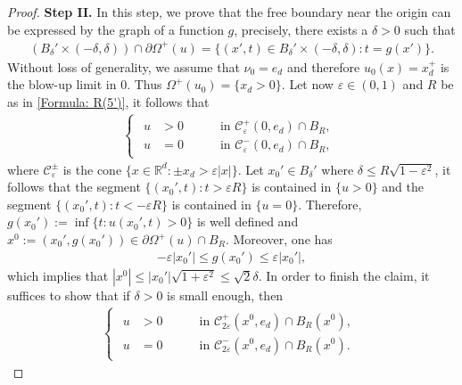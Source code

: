 \documentclass[11pt,reqno]{amsart}
\begin{document}
\begin{proof}
	\textbf{Step II.} In this step, we prove that the free boundary near the origin can be expressed by the graph of a function $g$, precisely, there exists a $\delta>0$ such that
	\begin{align*}
		(B_{\delta}'\times(-\delta,\delta))\cap\partial\varOmega^{+}(u)=\{(x',t)\in B_{\delta}'\times(-\delta,\delta)\colon t=g(x')\}.
	\end{align*}
	Without loss of generality, we assume that $\nu_{0}=e_{d}$ and therefore $u_{0}(x)=x_{d}^{+}$ is the blow-up limit in $0$. Thus $\varOmega^{+}(u_{0})=\{x_{d}>0\}$. Let now $\varepsilon\in(0,1)$ and $R$ be as in \eqref{Formula: R(5')}, it follows that
	\begin{align*}
		\begin{cases}
			\begin{alignedat}{2}
				u&>0\quad&&\text{ in }\mathcal{C}_{\varepsilon}^{+}(0,e_{d})\cap B_{R},\\
				u&=0\quad&&\text{ in }\mathcal{C}_{\varepsilon}^{-}(0,e_{d})\cap B_{R},
			\end{alignedat}
		\end{cases}
	\end{align*}
	where $\mathcal{C}_{\varepsilon}^{\pm}$ is the cone $\{x\in\mathbb{R}^{d}\colon\pm x_{d}>\varepsilon|x|\}$. Let $x_{0}'\in B_{\delta}'$ where $\delta\leqslant R\sqrt{1-\varepsilon^{2}}$, it follows that the segment $\{(x_{0}',t)\colon t>\varepsilon R\}$ is contained in $\{u>0\}$ and the segment $\{(x_{0}',t)\colon t<-\varepsilon R\}$ is contained in $\{u=0\}$. Therefore, $g(x_{0}'):=\inf\{t\colon u(x_{0}',t)>0\}$ is well defined and $x^{0}:=(x_{0}',g(x_{0}'))\in\partial\varOmega^{+}(u)\cap B_{R}$. Moreover, one has
	\begin{align*}
		-\varepsilon|x_{0}'|\leqslant g(x_{0}')\leqslant\varepsilon|x_{0}'|,
	\end{align*}
	which implies that $|x^{0}|\leqslant|x_{0}'|\sqrt{1+\varepsilon^{2}}\leqslant\sqrt{2}\delta$. In order to finish the claim, it suffices to show that if $\delta>0$ is small enough, then
	\begin{align}\label{Formula: R(8)}
		\begin{cases}
			\begin{alignedat}{2}
				u&>0\quad&&\text{ in }\mathcal{C}_{2\varepsilon}^{+}(x^{0},e_{d})\cap B_{R}(x^{0}),\\
				u&=0\quad&&\text{ in }\mathcal{C}_{2\varepsilon}^{-}(x^{0},e_{d})\cap B_{R}(x^{0}).
			\end{alignedat}
		\end{cases}

\end{align}
\end{proof}
\end{document}
